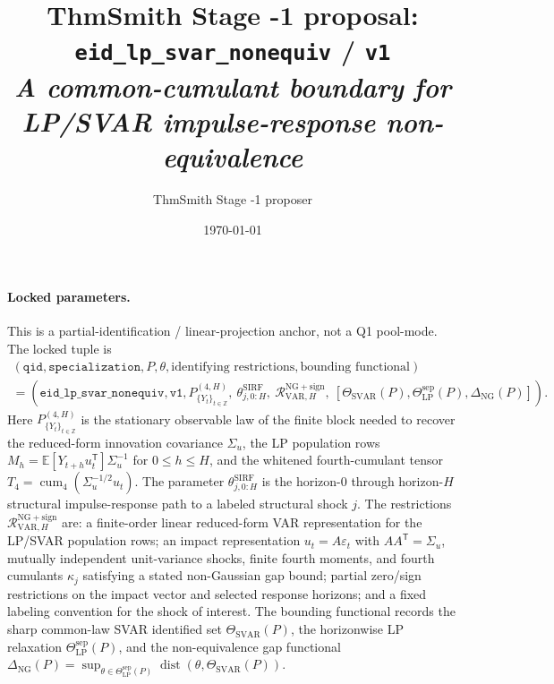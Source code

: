 \documentclass[11pt]{article}
\title{ThmSmith Stage -1 proposal: \texttt{eid\_lp\_svar\_nonequiv} / \texttt{v1}%
  \\ \large\textit{A common-cumulant boundary for LP/SVAR impulse-response non-equivalence}}
\author{ThmSmith Stage -1 proposer}
\date{\today}
\newcommand{\E}{\mathbb{E}}
\newcommand{\transpose}{\mathsf{T}}
\theoremstyle{definition}
\theoremstyle{plain}
\theoremstyle{remark}
\begin{document}
\maketitle


\paragraph{Locked parameters.}
This is a partial-identification / linear-projection anchor, not a Q1 pool-mode.  The locked tuple is
\[
\begin{gathered}
(\texttt{qid},\texttt{specialization},P,\theta,\text{identifying restrictions},
  \text{bounding functional})\\
=
(\texttt{eid\_lp\_svar\_nonequiv},\texttt{v1},
  P_{\{Y_t\}_{t\in\mathbb Z}}^{(4,H)},\
  \theta_{j,0:H}^{\mathrm{SIRF}},\
  \mathcal R_{\mathrm{VAR},H}^{\mathrm{NG+sign}},\
  [\Theta_{\mathrm{SVAR}}(P),\Theta_{\mathrm{LP}}^{\mathrm{sep}}(P),
   \Delta_{\mathrm{NG}}(P)]) .
\end{gathered}
\]
Here \(P_{\{Y_t\}_{t\in\mathbb Z}}^{(4,H)}\) is the stationary observable law of the finite block needed to recover the reduced-form innovation covariance \(\Sigma_u\), the LP population rows \(M_h=\E[Y_{t+h}u_t^\transpose]\Sigma_u^{-1}\) for \(0\le h\le H\), and the whitened fourth-cumulant tensor \(T_4=\operatorname{cum}_4(\Sigma_u^{-1/2}u_t)\).  The parameter \(\theta_{j,0:H}^{\mathrm{SIRF}}\) is the horizon-\(0\) through horizon-\(H\) structural impulse-response path to a labeled structural shock \(j\).  The restrictions \(\mathcal R_{\mathrm{VAR},H}^{\mathrm{NG+sign}}\) are: a finite-order linear reduced-form VAR representation for the LP/SVAR population rows; an impact representation \(u_t=A\varepsilon_t\) with \(AA^\transpose=\Sigma_u\), mutually independent unit-variance shocks, finite fourth moments, and fourth cumulants \(\kappa_j\) satisfying a stated non-Gaussian gap bound; partial zero/sign restrictions on the impact vector and selected response horizons; and a fixed labeling convention for the shock of interest.  The bounding functional records the sharp common-law SVAR identified set \(\Theta_{\mathrm{SVAR}}(P)\), the horizonwise LP relaxation \(\Theta_{\mathrm{LP}}^{\mathrm{sep}}(P)\), and the non-equivalence gap functional \(\Delta_{\mathrm{NG}}(P)=\sup_{\theta\in\Theta_{\mathrm{LP}}^{\mathrm{sep}}(P)}\operatorname{dist}(\theta,\Theta_{\mathrm{SVAR}}(P))\).
\end{document}
